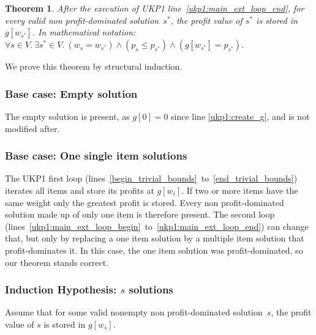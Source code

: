 \documentclass[12pt]{article}
\newtheorem{theorem}{Theorem}
\begin{document}
\begin{theorem}\label{theo:ukp1:all_relevant_solutions_present}
After the execution of UKP1 line~\ref{ukp1:main_ext_loop_end}, for every valid non profit-dominated solution~\(s^*\), the profit value of \(s^*\) is stored in \(g[w_{s^*}]\). In mathematical notation: \(\forall s \in V.~\exists s^* \in V.~(w_s = w_{s^*}) \land (p_s \leq p_{s^*}) \land (g[w_{s^*}] = p_{s^*})\).
\end{theorem}

We prove this theorem by structural induction.

\subsubsection{Base case: Empty solution}
\label{ukp1:empty_solution_proof}

The empty solution is present, as \(g[0] = 0\) since line \ref{ukp1:create_g}, and is not modified after.

\subsubsection{Base case: One single item solutions}
\label{ukp1:single_item_solution_proof}

The UKP1 first loop (lines~\ref{begin_trivial_bounds}~to~\ref{end_trivial_bounds}) iterates all items and store its profits at \(g[w_i]\). If two or more items have the same weight only the greatest profit is stored. Every non profit-dominated solution made up of only one item is therefore present. The second loop (lines~\ref{ukp1:main_ext_loop_begin}~to~\ref{ukp1:main_ext_loop_end}) can change that, but only by replacing a one item solution by a multiple item solution that profit-dominates it. In this case, the one item solution was profit-dominated, so our theorem stands correct.

\subsubsection{Induction Hypothesis: \(s\) solutions}

Assume that for some valid nonempty non profit-dominated solution~\(s\), the profit value of \(s\) is stored in \(g[w_s]\).
\end{document}
